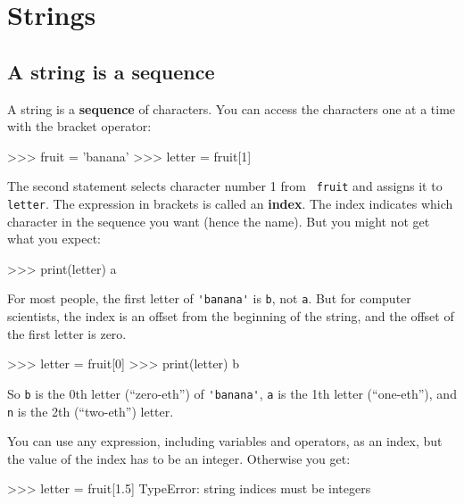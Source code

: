 \chapter{Strings}
\label{strings}


\section{A string is a sequence}

A string is a {\bf sequence} of characters.  
You can access the characters one at a time with the
bracket operator:

\beforeverb
\begin{pyinterpreter}
>>> fruit = 'banana'
>>> letter = fruit[1]
\end{pyinterpreter}
\afterverb
%
The second statement selects character number 1 from {\tt
fruit} and assigns it to {\tt letter}.  
%
%
The expression in brackets is called an {\bf index}.  
The index indicates which character in the sequence you
want (hence the name).
%
But you might not get what you expect:

\beforeverb
\begin{pyinterpreter}
>>> print(letter)
a
\end{pyinterpreter}
\afterverb
%
For most people, the first letter of \verb"'banana'" is {\tt b}, not
{\tt a}.  But for computer scientists, the index is an offset from the
beginning of the string, and the offset of the first letter is zero.

\beforeverb
\begin{pyinterpreter}
>>> letter = fruit[0]
>>> print(letter)
b
\end{pyinterpreter}
\afterverb
%
So {\tt b} is the 0th letter (``zero-eth'') of \verb"'banana'", {\tt a}
is the 1th letter (``one-eth''), and {\tt n} is the 2th (``two-eth'')
letter.


You can use any expression, including variables and operators, as an
index, but the value of the index has to be an integer.  Otherwise you
get:


\beforeverb
\begin{pyinterpreter}
>>> letter = fruit[1.5]
TypeError: string indices must be integers
\end{pyinterpreter}
\afterverb
%

